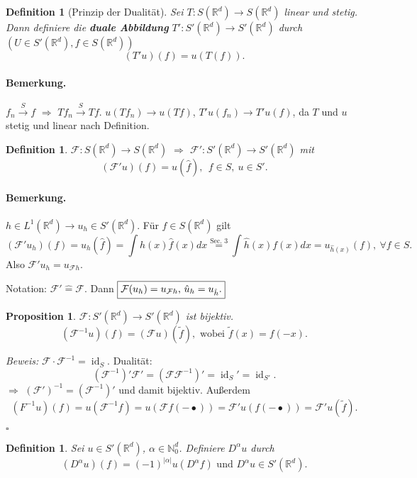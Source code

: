 \documentclass[11pt,a4paper,titlepage, ngerman]{scrartcl}
\newtheorem{Definition}[Satz]{Definition}
\newtheorem{Prop}[Satz]{Proposition}
\DeclareMathOperator{\id}{id}
\numberwithin{equation}{section}
\newcommand{\R}{\mathbb{R}} %
\newcommand{\N}{\mathbb{N}} %
\newcommand{\f}{\hat{f}}
\newcommand{\F}{\mathcal{F}}
\newcommand{\m}{\cdot}
\newcommand{\Bew}{\emph{Beweis: }}
\newcommand{\qed}{\begin{flushright}
		$\square$
	\end{flushright}}
\begin{document}
	\begin{Definition}[Prinzip der Dualität]
		Sei $T:S(\R^d)\rightarrow S(\R^d)$ linear und stetig. Dann definiere die \textbf{duale Abbildung} $T':S'(\R^d)\rightarrow S'(\R^d)$ durch $(U\in S'(\R^d), f\in S(\R^d))$
		$$(T'u)(f) = u(T(f)).$$
	\end{Definition}
	
	
	\paragraph{Bemerkung.} $f_n\overset{S}{\rightarrow} f$ $\Rightarrow$ $Tf_n\overset{S}{\rightarrow} Tf$. $u(Tf_n) \rightarrow u(Tf)$, $T'u(f_n)\rightarrow T'u(f)$, da $T$ und $u$ stetig und linear nach Definition.
	
	\begin{Definition}
		$\F:S(\R^d)\rightarrow S(\R^d)$ $\Rightarrow$ $\F':S'(\R^d)\rightarrow S'(\R^d)$ mit 
		$$(\F'u)(f) = u(\f),~~ f\in S,~ u\in S'.$$
	\end{Definition}
	
	\paragraph{Bemerkung.} $h\in L^1(\R^d)\rightarrow u_h\in S'(\R^d)$. Für $f\in S(\R^d)$ gilt 
	$$(\F'u_h)(f) = u_h(\f) = \int h(x) \f(x) dx \overset{\text{Sec. 3}}{=}\int \hat{h}(x)f(x) dx = u_{\hat h (x)}(f),~\forall f\in S.$$
	Also $\F'u_h = u_{\F h}$.
	
	Notation: $\F'\hat{=}\F$. Dann $\boxed{\F(u_h)=u_{\F h}$, $\hat{u}_h = u_{\hat h}.}$
	
	\begin{Prop}
		$\F: S'(\R^d)\rightarrow S'(\R^d)$ ist bijektiv.
		$$(\F^{-1}u)(f) = (\F u)(\tilde{f}), \text{ wobei } \tilde{f}(x) = f(-x).$$
	\end{Prop}
	
	\Bew $\F\m\F^{-1} = \id_S$. Dualität: 
	$$(\F^{-1})'\F' = (\F\F^{-1})' = \id_S'= \id_{S'}.$$
	$\Rightarrow$ $(\F')^{-1} = (\F^{-1})'$ und damit bijektiv. Außerdem 
	$$(F^{-1}u)(f) = u(\F^{-1}f) = u(\F f(-\bullet)) =  \F'u(f(-\bullet)) = \F'u(\tilde{f}).$$
	\qed
	
	
	\begin{Definition}
		Sei $u\in S'(\R^d)$, $\alpha\in \N_0^d$. Definiere $D^\alpha u$ durch
		$$(D^\alpha u)(f) = (-1)^{|\alpha|}u(D^\alpha f)\text{ und } D^\alpha u\in S'(\R^d).$$
	\end{Definition}
	
\end{document}
